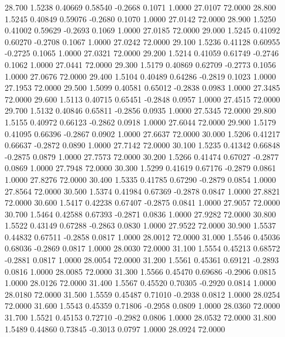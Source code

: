   28.700   1.5238   0.40669   0.58540  -0.2668   0.1071   1.0000  27.0107  72.0000
  28.800   1.5245   0.40849   0.59076  -0.2680   0.1070   1.0000  27.0142  72.0000
  28.900   1.5250   0.41002   0.59629  -0.2693   0.1069   1.0000  27.0185  72.0000
  29.000   1.5245   0.41092   0.60270  -0.2708   0.1067   1.0000  27.0242  72.0000
  29.100   1.5236   0.41128   0.60955  -0.2725   0.1065   1.0000  27.0321  72.0000
  29.200   1.5214   0.41059   0.61749  -0.2746   0.1062   1.0000  27.0441  72.0000
  29.300   1.5179   0.40869   0.62709  -0.2773   0.1056   1.0000  27.0676  72.0000
  29.400   1.5104   0.40489   0.64286  -0.2819   0.1023   1.0000  27.1953  72.0000
  29.500   1.5099   0.40581   0.65012  -0.2838   0.0983   1.0000  27.3485  72.0000
  29.600   1.5113   0.40715   0.65451  -0.2848   0.0957   1.0000  27.4515  72.0000
  29.700   1.5132   0.40846   0.65811  -0.2856   0.0935   1.0000  27.5345  72.0000
  29.800   1.5155   0.40972   0.66123  -0.2862   0.0918   1.0000  27.6044  72.0000
  29.900   1.5179   0.41095   0.66396  -0.2867   0.0902   1.0000  27.6637  72.0000
  30.000   1.5206   0.41217   0.66637  -0.2872   0.0890   1.0000  27.7142  72.0000
  30.100   1.5235   0.41342   0.66848  -0.2875   0.0879   1.0000  27.7573  72.0000
  30.200   1.5266   0.41474   0.67027  -0.2877   0.0869   1.0000  27.7948  72.0000
  30.300   1.5299   0.41619   0.67176  -0.2879   0.0861   1.0000  27.8276  72.0000
  30.400   1.5335   0.41785   0.67290  -0.2879   0.0854   1.0000  27.8564  72.0000
  30.500   1.5374   0.41984   0.67369  -0.2878   0.0847   1.0000  27.8821  72.0000
  30.600   1.5417   0.42238   0.67407  -0.2875   0.0841   1.0000  27.9057  72.0000
  30.700   1.5464   0.42588   0.67393  -0.2871   0.0836   1.0000  27.9282  72.0000
  30.800   1.5522   0.43149   0.67288  -0.2863   0.0830   1.0000  27.9522  72.0000
  30.900   1.5537   0.44832   0.67511  -0.2858   0.0817   1.0000  28.0012  72.0000
  31.000   1.5546   0.45036   0.68036  -0.2869   0.0817   1.0000  28.0030  72.0000
  31.100   1.5554   0.45213   0.68572  -0.2881   0.0817   1.0000  28.0054  72.0000
  31.200   1.5561   0.45361   0.69121  -0.2893   0.0816   1.0000  28.0085  72.0000
  31.300   1.5566   0.45470   0.69686  -0.2906   0.0815   1.0000  28.0126  72.0000
  31.400   1.5567   0.45520   0.70305  -0.2920   0.0814   1.0000  28.0180  72.0000
  31.500   1.5559   0.45487   0.71010  -0.2938   0.0812   1.0000  28.0254  72.0000
  31.600   1.5543   0.45359   0.71806  -0.2958   0.0809   1.0000  28.0360  72.0000
  31.700   1.5521   0.45153   0.72710  -0.2982   0.0806   1.0000  28.0532  72.0000
  31.800   1.5489   0.44860   0.73845  -0.3013   0.0797   1.0000  28.0924  72.0000
